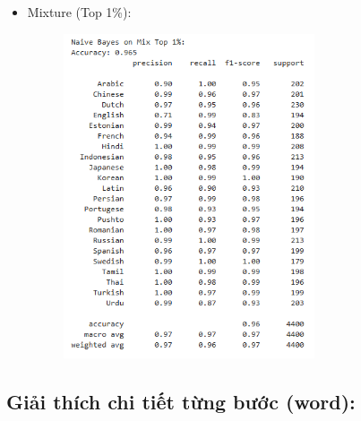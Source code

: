 \begin{itemize}
\begin{itemize}
\begin{figure}[H]
\end{figure}
\clearpage
        \item Mixture (Top 1\%):
        \begin{figure}[H]
    \centering
    \includegraphics[width=0.7\textwidth]{img/docspics/Picture24.png}
\end{figure}
    \end{itemize}
\end{itemize}
\clearpage
\subsection{Giải thích chi tiết từng bước (word):}

